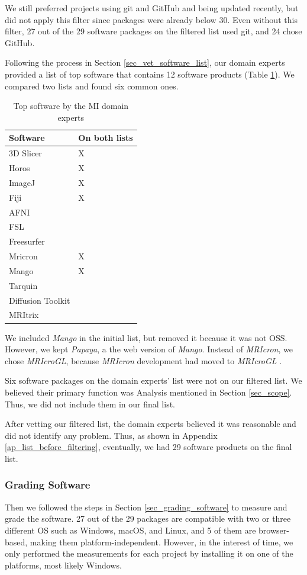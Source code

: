 \documentclass[3p, 12pt,authoryear]{elsarticle}
\begin{document}
We still preferred projects using git and GitHub and being updated recently, but
did not apply this filter since packages were already below 30. Even without
this filter, 27 out of the 29 software packages on the filtered list used git,
and 24 chose GitHub.

Following the process in Section \ref{sec_vet_software_list}, our domain experts
provided a list of top software that contains 12 software products (Table
\ref{tab_top_software_experts}). We compared two lists and found six common
ones.

\begin{table}[ht]
\centering
\begin{tabular}{ll}
\hline
Software & On both lists \\ \hline
3D Slicer & X \\
Horos & X \\
ImageJ & X \\
Fiji & X \\
AFNI &  \\
FSL &  \\
Freesurfer &  \\
Mricron & X \\
Mango & X \\
Tarquin &  \\
Diffusion Toolkit &  \\
MRItrix &  \\ \hline
\end{tabular}
\caption{\label{tab_top_software_experts}Top software by the MI domain experts}
\end{table}

We included \textit{Mango} in the initial list, but removed it because it was
not OSS. However, we kept \textit{Papaya}, a the web version of \textit{Mango}.
Instead of \textit{MRIcron}, we chose \textit{MRIcroGL}, because
\textit{MRIcron} development had moved to \textit{MRIcroGL} \citep{Rorden2021b}.

Six software packages on the domain experts' list were not on our filtered list.
We believed their primary function was Analysis mentioned in Section
\ref{sec_scope}. Thus, we did not include them in our final list.

After vetting our filtered list, the domain experts believed it was reasonable
and did not identify any problem. Thus, as shown in Appendix
\ref{ap_list_before_filtering}, eventually, we had 29 software products on the
final list. 

\subsubsection{Grading Software}
\label{sec_applying_method_grading}
Then we followed the steps in Section \ref{sec_grading_software} to measure and
grade the software. 27 out of the 29 packages are compatible with two or three
different OS such as Windows, macOS, and Linux, and 5 of them are browser-based,
making them platform-independent. However, in the interest of time, we only
performed the measurements for each project by installing it on one of the
platforms, most likely Windows.
\end{document}
